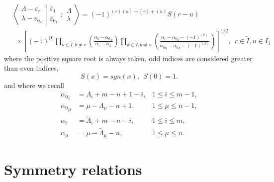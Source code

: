 \documentclass[12pt]{article}
\def\nn{\nonumber}
\begin{document}
\begin{align}
&\left\langle\left. 
\begin{array}{c} \Lambda-\varepsilon_r\\ \lambda-\varepsilon_{0_u} 
 \end{array}
\right|\right.
\left.
\begin{array}{c} \bar{\varepsilon}_1 \\ \bar{\varepsilon}_{0_1} 
 \end{array}
; \begin{array}{c} \Lambda \\ \lambda
 \end{array}
\right\rangle = (-1)^{(r)(u) +(r) + (u)} S(r-u) 
\nn\\
&~~\times
\left[
 (-1)^{|I|} \prod_{k\in \tilde{I},k\neq r} 
\left(
\frac 
{\alpha_k - {\alpha_0}_u  }
{\alpha_r - \alpha_k }
\right)
\prod_{k\in I,k \neq u} 
\left(
\frac
{ \alpha_r - {\alpha_0}_k - (-1)^{(k)} }
{{\alpha_0}_u - {\alpha_0}_k - (-1)^{(k)} }
\right)
\right]^{1/2}
,\ \ r\in \tilde{I},u\in I_1  \label{FinalUnBarredOdd}
\end{align}
where the positive square root is always taken, odd indices are considered greater than even indices, 
$$
S(x) = sgn(x),~~S(0)=1.
$$
and where we recall
\begin{align*}
{\alpha_0}_i &= \Lambda_i + m - n + 1 - i  , &1\leq i\leq m-1, \\
{\alpha_0}_\mu &= \mu - \Lambda_\mu -n + 1, &1\leq \mu \leq n-1 , \\
\alpha_i &= {\tilde{\Lambda}}_i + m - n - i, &1\leq i\leq m, \\
\alpha_\mu &= \mu-{\tilde{\Lambda}}_\mu - n, &1\leq \mu \leq n .  
\end{align*}


\section{Symmetry relations}
\end{document}
